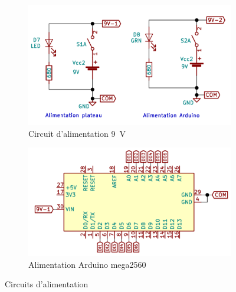 \begin{figure}[h!]
    \centering

    \begin{subfigure}{0.4\linewidth}
        \centering
        \includegraphics[width=\linewidth]{img/s2/verre/Figure2}
        \caption{Circuit d’alimentation 9~V}
        \label{fig:s2-verre-Figure2}
    \end{subfigure}
    \begin{subfigure}{0.4\linewidth}
        \centering
        \includegraphics[width=\linewidth]{img/s2/verre/Figure3}
        \caption{Alimentation Arduino mega2560}
        \label{fig:s2-verre-Figure3}
    \end{subfigure}

    \caption{Circuits d'alimentation}
    \label{fig:s2-verre-alimentation}
\end{figure}

